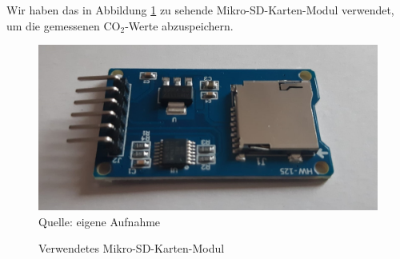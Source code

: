 \label{microSD}

Wir haben das in Abbildung \ref{fig:SD-Modul} zu sehende Mikro-SD-Karten-Modul verwendet, um die gemessenen CO$_2$-Werte abzuspeichern.

\begin{figure}[!hbt]
	\centering
	\includegraphics[width=0.7\linewidth]{Images/Mikro-SD_2}
	\footnotesize{\\ Quelle: eigene Aufnahme}
	\caption{Verwendetes Mikro-SD-Karten-Modul}
	\label{fig:SD-Modul}
\end{figure}
